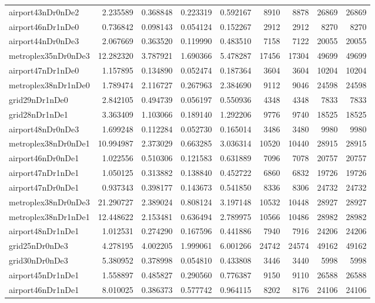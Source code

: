 \begin{longtable}{|l|r|r|r|r|r|r|r|r|}
airport43nDr0nDe2 & 2.235589 & 0.368848 & 0.223319 & 0.592167 & 8910 & 8878 & 26869 & 26869 \\
airport46nDr1nDe0 & 0.736842 & 0.098143 & 0.054124 & 0.152267 & 2912 & 2912 & 8270 & 8270 \\
airport44nDr0nDe3 & 2.067669 & 0.363520 & 0.119990 & 0.483510 & 7158 & 7122 & 20055 & 20055 \\
metroplex35nDr0nDe3 & 12.282320 & 3.787921 & 1.690366 & 5.478287 & 17456 & 17304 & 49699 & 49699 \\
airport47nDr1nDe0 & 1.157895 & 0.134890 & 0.052474 & 0.187364 & 3604 & 3604 & 10204 & 10204 \\
metroplex38nDr1nDe0 & 1.789474 & 2.116727 & 0.267963 & 2.384690 & 9112 & 9046 & 24598 & 24598 \\
grid29nDr1nDe0 & 2.842105 & 0.494739 & 0.056197 & 0.550936 & 4348 & 4348 & 7833 & 7833 \\
grid28nDr1nDe1 & 3.363409 & 1.103066 & 0.189140 & 1.292206 & 9776 & 9740 & 18525 & 18525 \\
airport48nDr0nDe3 & 1.699248 & 0.112284 & 0.052730 & 0.165014 & 3486 & 3480 & 9980 & 9980 \\
metroplex38nDr0nDe1 & 10.994987 & 2.373029 & 0.663285 & 3.036314 & 10520 & 10440 & 28915 & 28915 \\
airport46nDr0nDe1 & 1.022556 & 0.510306 & 0.121583 & 0.631889 & 7096 & 7078 & 20757 & 20757 \\
airport47nDr1nDe1 & 1.050125 & 0.313882 & 0.138840 & 0.452722 & 6860 & 6832 & 19726 & 19726 \\
airport47nDr0nDe1 & 0.937343 & 0.398177 & 0.143673 & 0.541850 & 8336 & 8306 & 24732 & 24732 \\
metroplex38nDr0nDe3 & 21.290727 & 2.389024 & 0.808124 & 3.197148 & 10532 & 10448 & 28927 & 28927 \\
metroplex38nDr1nDe1 & 12.448622 & 2.153481 & 0.636494 & 2.789975 & 10566 & 10486 & 28982 & 28982 \\
airport48nDr1nDe1 & 1.012531 & 0.274290 & 0.167596 & 0.441886 & 7940 & 7916 & 24206 & 24206 \\
grid25nDr0nDe3 & 4.278195 & 4.002205 & 1.999061 & 6.001266 & 24742 & 24574 & 49162 & 49162 \\
grid30nDr0nDe3 & 5.380952 & 0.378998 & 0.054810 & 0.433808 & 3446 & 3440 & 5998 & 5998 \\
airport45nDr1nDe1 & 1.558897 & 0.485827 & 0.290560 & 0.776387 & 9150 & 9110 & 26588 & 26588 \\
airport46nDr1nDe1 & 8.010025 & 0.386373 & 0.577742 & 0.964115 & 8202 & 8176 & 24106 & 24106 \\

\end{longtable}
